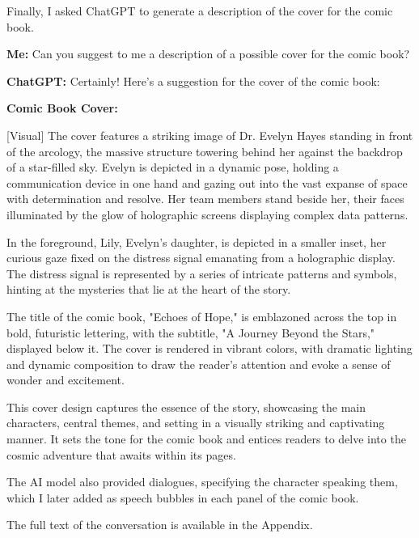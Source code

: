 \documentclass[a4paper,11pt]{article}
\newenvironment{shadedquotation1}
    {\colorlet{shadecolor}{JungleGreen!15}\begin{shaded*}
    \quoting[leftmargin=1cm, rightmargin=1cm, vskip=0pt]
    }
    {\endquoting
    \end{shaded*}
}
\begin{document}
Finally, I asked ChatGPT to generate a description of the cover for the comic book.
\begin{shadedquotation1}
    \textbf{Me:} Can you suggest to me a description of a possible cover for the comic book?\bigskip 

    \noindent\textbf{ChatGPT:} Certainly! Here's a suggestion for the cover of the comic book:\medskip

    \noindent\textbf{Comic Book Cover:}\smallskip
    
    [Visual] The cover features a striking image of Dr. Evelyn Hayes standing in front of the arcology, the massive structure towering behind her against the backdrop of a star-filled sky. Evelyn is depicted in a dynamic pose, holding a communication device in one hand and gazing out into the vast expanse of space with determination and resolve. Her team members stand beside her, their faces illuminated by the glow of holographic screens displaying complex data patterns.
    
    In the foreground, Lily, Evelyn's daughter, is depicted in a smaller inset, her curious gaze fixed on the distress signal emanating from a holographic display. The distress signal is represented by a series of intricate patterns and symbols, hinting at the mysteries that lie at the heart of the story.
    
    The title of the comic book, "Echoes of Hope," is emblazoned across the top in bold, futuristic lettering, with the subtitle, "A Journey Beyond the Stars," displayed below it. The cover is rendered in vibrant colors, with dramatic lighting and dynamic composition to draw the reader's attention and evoke a sense of wonder and excitement.\medskip
    
    This cover design captures the essence of the story, showcasing the main characters, central themes, and setting in a visually striking and captivating manner. It sets the tone for the comic book and entices readers to delve into the cosmic adventure that awaits within its pages.
\end{shadedquotation1}

The AI model also provided dialogues, specifying the character speaking them, which I later added as speech bubbles in each panel of the comic book.\medskip

The full text of the conversation is available in the Appendix.
\end{document}
